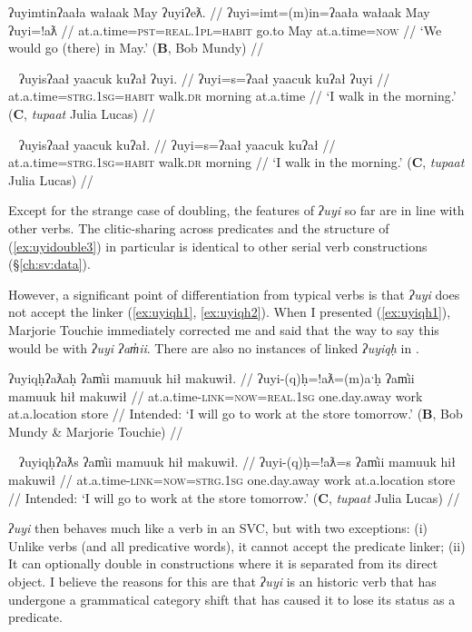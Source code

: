 \ex \label{ex:uyidouble1}
\begingl
\glpreamble ʔuyimtinʔaała wałaak May ʔuyiʔeƛ. //
\gla ʔuyi=imt=(m)in=ʔaała wałaak May ʔuyi=!aƛ //
\glb at.a.time=\textsc{pst}=\textsc{real.1pl}=\textsc{habit} go.to May at.a.time=\textsc{now} //
\glft `We would go (there) in May.' (\textbf{B}, Bob Mundy) //
\endgl
\xe

\ex~ \label{ex:uyidouble2}
\begingl
\glpreamble ʔuyisʔaał yaacuk kuʔał ʔuyi. //
\gla ʔuyi=s=ʔaał yaacuk kuʔał ʔuyi //
\glb at.a.time=\textsc{strg.1sg}=\textsc{habit} walk.\textsc{dr} morning at.a.time //
\glft `I walk in the morning.' (\textbf{C}, \textit{tupaat} Julia Lucas) //
\endgl
\xe

\ex~ \label{ex:uyidouble3}
\begingl
\glpreamble ʔuyisʔaał yaacuk kuʔał. //
\gla ʔuyi=s=ʔaał yaacuk kuʔał //
\glb at.a.time=\textsc{strg.1sg}=\textsc{habit} walk.\textsc{dr} morning //
\glft `I walk in the morning.' (\textbf{C}, \textit{tupaat} Julia Lucas) //
\endgl
\xe

Except for the strange case of doubling, the features of \textit{ʔuyi} so far are in line with other verbs. The clitic-sharing across predicates and the structure of (\ref{ex:uyidouble3}) in particular is identical to other serial verb constructions (\S\ref{ch:sv:data}).

However, a significant point of differentiation from typical verbs is that \textit{ʔuyi} does not accept the linker (\ref{ex:uyiqh1}, \ref{ex:uyiqh2}). When I presented (\ref{ex:uyiqh1}), Marjorie Touchie immediately corrected me and said that the way to say this would be with \textit{ʔuyi ʔam̓ii}. There are also no instances of linked \textit{ʔuyiqḥ} in \citet{sapir1939, sapir1955}.

\ex \label{ex:uyiqh1}
\begingl
\glpreamble *ʔuyiqḥʔaƛaḥ ʔam̓ii mamuuk hił makuwił. //
\gla ʔuyi-(q)ḥ=!aƛ=(m)aˑḥ ʔam̓ii mamuuk hił makuwił //
\glb at.a.time-\textsc{link}=\textsc{now}=\textsc{real.1sg} one.day.away work at.a.location store //
\glft Intended: `I will go to work at the store tomorrow.' (\textbf{B}, Bob Mundy \& Marjorie Touchie) //
\endgl
\xe

\ex~ \label{ex:uyiqh2}
\begingl
\glpreamble *ʔuyiqḥʔaƛs ʔam̓ii mamuuk hił makuwił. //
\gla ʔuyi-(q)ḥ=!aƛ=s ʔam̓ii mamuuk hił makuwił //
\glb at.a.time-\textsc{link}=\textsc{now}=\textsc{strg.1sg} one.day.away work at.a.location store //
\glft Intended: `I will go to work at the store tomorrow.' (\textbf{C}, \textit{tupaat} Julia Lucas) //
\endgl
\xe

\textit{ʔuyi} then behaves much like a verb in an SVC, but with two exceptions: (i) Unlike verbs (and all predicative words), it cannot accept the predicate linker; (ii) It can optionally double in constructions where it is separated from its direct object. I believe the reasons for this are that \textit{ʔuyi} is an historic verb that has undergone a grammatical category shift that has caused it to lose its status as a predicate.

